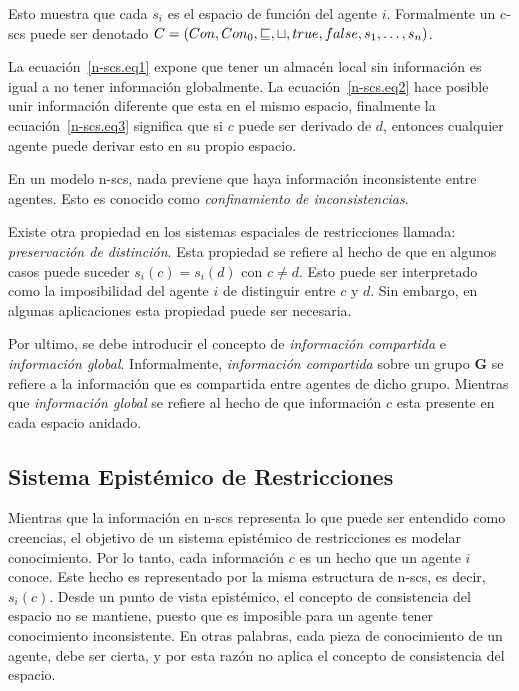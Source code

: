 Esto muestra que cada $s_i$ es el espacio de funci\'on del agente $i$. Formalmente un c-scs puede ser denotado $C = (Con, Con_0, \sqsubseteq, \sqcup, true, false, s_1, \mathellipsis, s_n)$. 

La ecuaci\'on~\ref{n-scs.eq1} expone que tener un almac\'en local sin informaci\'on es igual a no tener informaci\'on globalmente.  La ecuaci\'on~\ref{n-scs.eq2} hace posible unir informaci\'on diferente que esta en el mismo espacio, finalmente la ecuaci\'on~\ref{n-scs.eq3} significa que si $c$ puede ser derivado de $d$, entonces cualquier agente puede derivar esto en su propio espacio.

En un modelo n-scs, nada previene que haya informaci\'on inconsistente entre agentes. Esto es conocido como \textit{confinamiento de inconsistencias}.

Existe otra propiedad en los sistemas espaciales de restricciones llamada: \textit{preservaci\'on de distinci\'on}. Esta propiedad se refiere al hecho de que en algunos casos puede suceder $s_i(c)=s_i(d)$ con $c\neq d$. Esto puede ser interpretado como la imposibilidad del agente $i$ de distinguir entre $c$ y $d$. Sin embargo, en algunas aplicaciones esta propiedad puede ser necesaria.

Por ultimo, se debe introducir el concepto de \textit{informaci\'on compartida} e \textit{informaci\'on global}. Informalmente, \textit{informaci\'on compartida} sobre un grupo \textbf{G} se refiere a la informaci\'on que es compartida entre agentes de dicho grupo. Mientras que \textit{informaci\'on global} se refiere al hecho de que informaci\'on $c$ esta presente en cada espacio anidado.

\subsection{Sistema Epist\'emico de Restricciones}
\label{sepr.cap3}

Mientras que la informaci\'on en n-scs representa lo que puede ser entendido como creencias, el objetivo de un sistema epist\'emico de restricciones es modelar conocimiento. Por lo tanto, cada informaci\'on $c$ es un hecho que un agente $i$ conoce. Este hecho es representado por la misma estructura de n-scs, es decir, $s_i(c)$. Desde un punto de vista epist\'emico, el concepto de consistencia del espacio no se mantiene, puesto que es imposible para un agente tener conocimiento inconsistente. En otras palabras, cada pieza de conocimiento de un agente, debe ser cierta, y por esta raz\'on no aplica el concepto de consistencia del espacio.

